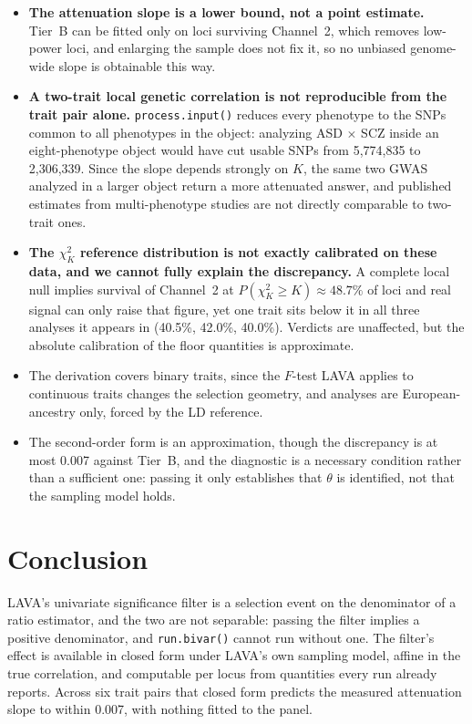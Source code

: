 \documentclass[12pt,a4paper]{article}
\begin{document}
\begin{itemize}
\item \textbf{The attenuation slope is a lower bound, not a point estimate.} Tier~B can be
  fitted only on loci surviving Channel~2, which removes low-power loci, and enlarging the
  sample does not fix it, so no unbiased genome-wide slope is obtainable this way.
\item \textbf{A two-trait local genetic correlation is not reproducible from the trait
  pair alone.} \texttt{process.input()} reduces every phenotype to the SNPs common to all
  phenotypes in the object: analyzing ASD $\times$ SCZ inside an eight-phenotype object
  would have cut usable SNPs from 5,774,835 to 2,306,339. Since the slope depends strongly
  on $K$, the same two GWAS analyzed in a larger object return a more attenuated answer,
  and published estimates from multi-phenotype studies are not directly comparable to
  two-trait ones.
\item \textbf{The $\chi^2_K$ reference distribution is not exactly calibrated on these
  data, and we cannot fully explain the discrepancy.} A complete local null implies
  survival of Channel~2 at $P(\chi^2_K\ge K)\approx48.7\%$ of loci and real signal can only
  raise that figure, yet one trait sits below it in all three analyses it appears in
  (40.5\%, 42.0\%, 40.0\%). Verdicts are unaffected, but the absolute calibration of the
  floor quantities is approximate.
\item The derivation covers binary traits, since the $F$-test LAVA applies to continuous
  traits changes the selection geometry, and analyses are European-ancestry only, forced by
  the LD reference.
\item The second-order form is an approximation, though the discrepancy is at most 0.007
  against Tier~B, and the diagnostic is a necessary condition rather than a sufficient one:
  passing it only establishes that $\theta$ is identified, not that the sampling model holds.
\end{itemize}
\section{Conclusion}\label{sec:conclusion}

LAVA's univariate significance filter is a selection event on the denominator of a ratio
estimator, and the two are not separable: passing the filter implies a positive
denominator, and \texttt{run.bivar()} cannot run without one. The filter's effect is
available in closed form under LAVA's own sampling model, affine in the true
correlation, and computable per locus from quantities every run already reports. Across
six trait pairs that closed form predicts the measured attenuation slope to within 0.007,
with nothing fitted to the panel.
\end{document}
